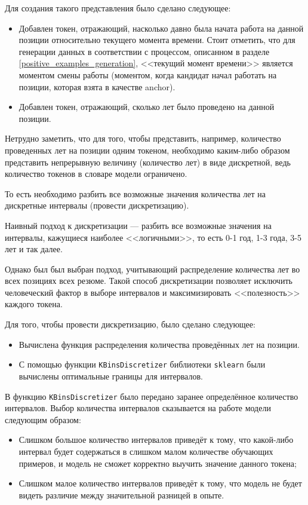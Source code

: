 \documentclass[14pt]{mmcs_article}
\begin{document}
Для создания такого представления было сделано следующее:

\begin{itemize}
  \item Добавлен токен, отражающий, насколько давно была начата работа на данной позиции относительно текущего момента времени. Стоит отметить, что для генерации данных в соответствии с процессом, описанном в разделе \ref{positive_examples_generation}, <<текущий момент времени>> является моментом смены работы (моментом, когда кандидат начал работать на позиции, которая взята в качестве anchor).
  \item Добавлен токен, отражающий, сколько лет было проведено на данной позиции.
\end{itemize}

Нетрудно заметить, что для того, чтобы представить, например, количество проведенных лет на позиции одним токеном, необходимо каким-либо образом представить непрерывную величину (количество лет) в виде дискретной, ведь количество токенов в словаре модели ограничено.

То есть необходимо разбить все возможные значения количества лет на дискретные интервалы (провести дискретизацию).

Наивный подход к дискретизации --- разбить все возможные значения на интервалы, кажущиеся наиболее <<логичными>>, то есть 0-1 год, 1-3 года, 3-5 лет и так далее.

Однако был был выбран подход, учитывающий распределение количества лет во всех позициях всех резюме. Такой способ дискретизации позволяет исключить человеческий фактор в выборе интервалов и максимизировать <<полезность>> каждого токена.

Для того, чтобы провести дискретизацию, было сделано следующее:

\begin{itemize}
  \item Вычислена функция распределения количества проведённых лет на позиции.
  \item С помощью функции \texttt{KBinsDiscretizer} библиотеки \texttt{sklearn} \cite{pedregosa2018scikitlearnmachinelearningpython} были вычислены оптимальные границы для интервалов.
\end{itemize}

В функцию \texttt{KBinsDiscretizer} было передано заранее определённое количество интервалов. Выбор количества интервалов сказывается на работе модели следующим образом:

\begin{itemize}
  \item Слишком большое количество интервалов приведёт к тому, что какой-либо интервал будет содержаться в слишком малом количестве обучающих примеров, и модель не сможет корректно выучить значение данного токена;
  \item Слишком малое количество интервалов приведёт к тому, что модель не будет видеть различие между значительной разницей в опыте.
\end{itemize}
\end{document}
